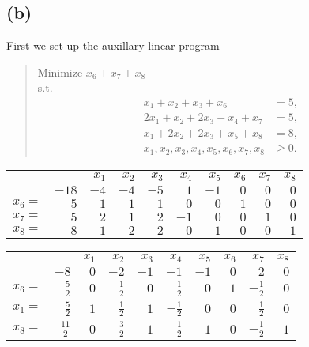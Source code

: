 \documentclass{article}
\theoremstyle{definition}
\begin{document}
\subsection*{(b)}
First we set up the auxillary linear program
\begin{quote}
  Minimize $x_6+x_7+x_8$ \\
  s.t.
  \begin{align*}
    x_1+x_2+x_3+x_6 &= 5, \\
    2x_1+x_2+2x_3-x_4+x_7 &= 5, \\
    x_1+2x_2+2x_3+x_5+x_8 &= 8, \\
    x_1, x_2, x_3, x_4, x_5, x_6, x_7, x_8 &\geq 0.
  \end{align*}
\end{quote}
\bgroup
\def\arraystretch{1.5}
\begin{table}[H]
  \begin{tabular}{r|r|rrrrrrrr|}
  \cline{2-10}
    &   & $x_1$ & $x_2$ & $x_3$ & $x_4$ & $x_5$ & $x_6$ & $x_7$ & $x_8$ \\ \cline{2-10}
    & $-18$ & $-4$ & $-4$ & $-5$ & $1$ & $-1$ & $0$ & $0$ & $0$ \\ \cline{2-10}
  $x_6 = $ & $5$ & $1$ & $1$ & $1$ & $0$ & $0$ & $1$ & $0$ & $0$ \\ 
  $x_7 = $ & $5$ & $2$ & $1$ & $2$ & $-1$ & $0$ & $0$ & $1$ & $0$ \\ 
  $x_8 = $ & $8$ & $1$ & $2$ & $2$ & $0$ & $1$ & $0$ & $0$ & $1$ \\ \cline{2-10}
  \end{tabular}
\end{table}
\egroup
\bgroup
\def\arraystretch{1.5}
\begin{table}[H]
  \begin{tabular}{r|r|rrrrrrrr|}
  \cline{2-10}
    &   & $x_1$ & $x_2$ & $x_3$ & $x_4$ & $x_5$ & $x_6$ & $x_7$ & $x_8$ \\ \cline{2-10}
    & $-8$ & $0$ & $-2$ & $-1$ & $-1$ & $-1$ & $0$ & $2$ & $0$ \\ \cline{2-10}
  $x_6 = $ & $\tfrac{5}{2}$ & $0$ & $\tfrac{1}{2}$ & $0$ & $\tfrac{1}{2}$ & $0$ & $1$ & $-\tfrac{1}{2}$ & $0$ \\ 
  $x_1 = $ & $\tfrac{5}{2}$ & $1$ & $\tfrac{1}{2}$ & $1$ & $-\tfrac{1}{2}$ & $0$ & $0$ & $\tfrac{1}{2}$ & $0$ \\ 
  $x_8 = $ & $\tfrac{11}{2}$ & $0$ & $\tfrac{3}{2}$ & $1$ & $\tfrac{1}{2}$ & $1$ & $0$ & $-\tfrac{1}{2}$ & $1$ \\ \cline{2-10}
  \end{tabular}
\end{table}
\end{document}
